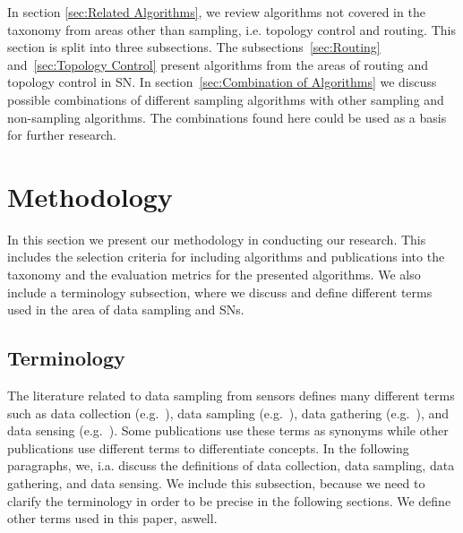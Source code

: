  In section \ref{sec:Related
Algorithms}, we review algorithms not covered in the taxonomy from areas other
than sampling, i.e. topology control and routing. This section is split into
three subsections. The subsections~\ref{sec:Routing} and~\ref{sec:Topology
Control} present algorithms from the areas of routing and topology control in
\ac{SN}. In section~\ref{sec:Combination of Algorithms} we discuss possible
combinations of different sampling algorithms with other sampling and
non-sampling algorithms. The combinations found here could be used as a basis
for further research.

\section{Methodology}
\label{sec:Methodology}

In this section we present our methodology in conducting our research. This
includes the selection criteria for including algorithms and publications into
the taxonomy and the evaluation metrics for the presented algorithms. We also
include a terminology subsection, where we discuss and define different terms
used in the area of data sampling and \acp{SN}.

\subsection{Terminology}
\label{sec:Terminology}


The literature related to data sampling from sensors defines many different
terms such as data collection (e.g.~\cite{laiymani2013adaptive, liu2007energy,
wang2012adaptive}), data sampling (e.g.~\cite{willett2004backcasting,
jain2004adaptive, szczytowski2010asample}), data gathering
(e.g.~\cite{wang2012data, luo2009compressive, zhang2016data}), and data sensing
(e.g.~\cite{padhy2006utility, mahmudimanesh2012balanced, duarte2005joint}).
Some publications use these terms as synonyms while other publications use
different terms to differentiate concepts. In the following paragraphs, we,
i.a. discuss the definitions of data collection, data sampling, data gathering,
and data sensing. We include this subsection, because we need to clarify the
terminology in order to be precise in the following sections. We define other
terms used in this paper, aswell.

